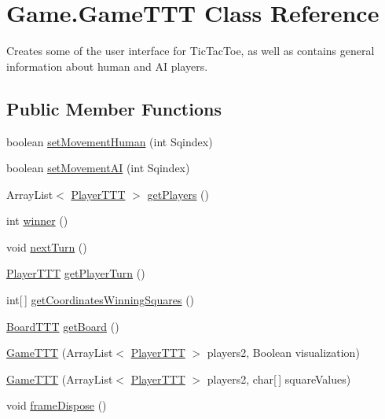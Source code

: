\hypertarget{class_game_1_1_game_t_t_t}{}\section{Game.\+Game\+T\+T\+T Class Reference}
\label{class_game_1_1_game_t_t_t}


Creates some of the user interface for Tic\+Tac\+Toe, as well as contains general information about human and A\+I players.  


\subsection*{Public Member Functions}
\begin{DoxyCompactItemize}
\item 
boolean \hyperlink{class_game_1_1_game_t_t_t_a0791200e84a23a5dc121df19e6b6d308}{set\+Movement\+Human} (int Sqindex)
\item 
boolean \hyperlink{class_game_1_1_game_t_t_t_a85cffeaf994f8a35e3c56282b641a7a6}{set\+Movement\+A\+I} (int Sqindex)
\item 
Array\+List$<$ \hyperlink{class_player_1_1_player_t_t_t}{Player\+T\+T\+T} $>$ \hyperlink{class_game_1_1_game_t_t_t_a079a7a4f3c45ad5613a5765494c45d07}{get\+Players} ()
\item 
int \hyperlink{class_game_1_1_game_t_t_t_ac1f85bc3a5fc38f6ce84d53f36591ccd}{winner} ()
\item 
void \hyperlink{class_game_1_1_game_t_t_t_a8cbcf85e799d76e5c1b17dc54a3bc113}{next\+Turn} ()
\item 
\hyperlink{class_player_1_1_player_t_t_t}{Player\+T\+T\+T} \hyperlink{class_game_1_1_game_t_t_t_a751517c76715c85be2ff6b22ea1dbfe4}{get\+Player\+Turn} ()
\item 
int\mbox{[}$\,$\mbox{]} \hyperlink{class_game_1_1_game_t_t_t_a73acd5e17507d3c5aaca626202c61b1b}{get\+Coordinates\+Winning\+Squares} ()
\item 
\hyperlink{class_board_1_1_board_t_t_t}{Board\+T\+T\+T} \hyperlink{class_game_1_1_game_t_t_t_a2bc6494f74d04c47d2b294be71ee083f}{get\+Board} ()
\item 
\hyperlink{class_game_1_1_game_t_t_t_a730d7c27a82de9c4c5125b7fd8466ff2}{Game\+T\+T\+T} (Array\+List$<$ \hyperlink{class_player_1_1_player_t_t_t}{Player\+T\+T\+T} $>$ players2, Boolean visualization)
\item 
\hyperlink{class_game_1_1_game_t_t_t_adadd26eb4181169333b929dace529d2b}{Game\+T\+T\+T} (Array\+List$<$ \hyperlink{class_player_1_1_player_t_t_t}{Player\+T\+T\+T} $>$ players2, char\mbox{[}$\,$\mbox{]} square\+Values)
\item 
void \hyperlink{class_game_1_1_game_t_t_t_aa34199a3a29bba81669f56a08703d451}{frame\+Dispose} ()
\end{DoxyCompactItemize}
